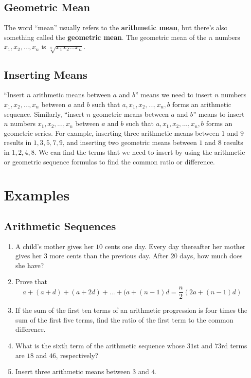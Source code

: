 \documentclass[twocolumn]{article}
\begin{document}
    \subsection*{Geometric Mean}
    The word ``mean'' usually refers to the \textbf{arithmetic mean}, but
    there's also something called the \textbf{geometric mean}. The geometric
    mean of the $n$ numbers $x_1, x_2, \dots, x_n$ is $\sqrt[n]{x_1 x_2
    \dots x_n}$.

    \subsection*{Inserting Means}
    ``Insert $n$ arithmetic means between $a$ and $b$'' means we need to
    insert $n$ numbers $x_1, x_2, \dots, x_n$ between $a$ and $b$ such that
    $a, x_1, x_2, \dots, x_n, b$ forms an arithmetic sequence. Similarly,
    ``insert $n$ geometric means between $a$ and $b$'' means to insert $n$
    numbers $x_1, x_2, \dots, x_n$ between $a$ and $b$ such that $a, x_1,
    x_2, \dots, x_n, b$ forms an geometric series. For example, inserting
    three arithmetic means between $1$ and $9$ results in $1, 3, 5, 7, 9$,
    and inserting two geometric means between $1$ and $8$ results in $1, 2,
    4, 8$. We can find the terms that we need to insert by using the
    arithmetic or geometric sequence formulas to find the common ratio or
    difference.

    \section*{Examples}
    \subsection*{Arithmetic Sequences}
    \begin{enumerate}
        \item A child’s mother gives her $10$ cents one day. Every day
        thereafter her mother gives her $3$ more cents than the previous
        day. After $20$ days, how much does she have?
        \vspace{3cm}
        \item Prove that
        \[a + (a + d) + (a + 2d) + \dots + (a + (n - 1)d = \frac{n}{2}(2a +
        (n - 1)d)\]
        \vspace{3cm}
        \item If the sum of the first ten terms of an arithmetic progression
        is four times the sum of the first five terms, find the ratio of the
        first term to the common difference.
        \vspace{3cm}
        \item What is the sixth term of the arithmetic sequence whose $31$st
        and $73$rd terms are $18$ and $46$, respectively?
        \vspace{3cm}
        \item Insert three arithmetic means between $3$ and $4$.
        \vspace{3cm}
    \end{enumerate}
\end{document}
